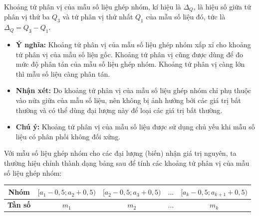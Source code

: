 \documentclass[12pt,a4paper]{extarticle}
\begin{document}
\vspace{1.5em}

\begin{tcolorbox}[
    colback=blue!5!white,
    colframe=blue!75!black,
    sharp corners,
    boxrule=0pt,
    leftrule=3pt,
    top=8pt,
    bottom=8pt,
    left=12pt
]
    Khoảng tứ phân vị của mẫu số liệu ghép nhóm, kí hiệu là $\Delta_Q$, là hiệu số giữa tứ phân vị thứ ba $Q_3$ và tứ phân vị thứ nhất $Q_1$ của mẫu số liệu đó, tức là \textbf{\color{blue!80!black}$\Delta_Q = Q_3 - Q_1$}.
\end{tcolorbox}

\vspace{0.5em}

\begin{itemize}[leftmargin=*, label={\color{blue!80!black}$\blacktriangleright$}, itemsep=0.8em]
    \item \textbf{Ý nghĩa:} Khoảng tứ phân vị của mẫu số liệu ghép nhóm xấp xỉ cho khoảng tứ phân vị của mẫu số liệu gốc. Khoảng tứ phân vị cũng được dùng để đo mức độ phân tán của mẫu số liệu ghép nhóm. Khoảng tứ phân vị càng lớn thì mẫu số liệu càng phân tán.
    \item \textbf{Nhận xét:} Do khoảng tứ phân vị của mẫu số liệu ghép nhóm chỉ phụ thuộc vào nửa giữa của mẫu số liệu, nên không bị ảnh hưởng bởi các giá trị bất thường và có thể dùng đại lượng này để loại các giá trị bất thường.
    \item \textbf{Chú ý:} Khoảng tứ phân vị của mẫu số liệu được sử dụng chủ yếu khi mẫu số liệu có phân phối không đối xứng.
\end{itemize}

\vspace{1.5em}
\noindent Với mẫu số liệu ghép nhóm cho các đại lượng (biến) nhận giá trị nguyên, ta thường hiệu chỉnh thành dạng bảng sau để tính các khoảng tứ phân vị của mẫu số liệu ghép nhóm:

\begin{center}
    \renewcommand{\arraystretch}{1.5}
    \begin{tabular}{|c|c|c|c|c|}
        \hline
        \textbf{Nhóm} & $[a_1 - 0{,}5; a_2 + 0{,}5)$ & $[a_2 - 0{,}5; a_3 + 0{,}5)$ & $\dots$ & $[a_k - 0{,}5; a_{k+1} + 0{,}5)$ \\
        \hline
        \textbf{Tần số} & $m_1$ & $m_2$ & $\dots$ & $m_k$ \\
        \hline
    \end{tabular}
\end{center}
\end{document}

